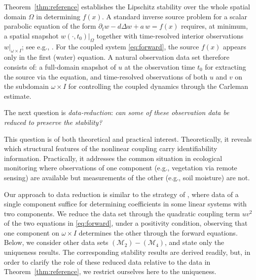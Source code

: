 \documentclass[12pt]{amsart}
\theoremstyle{plain}
\theoremstyle{definition}
\theoremstyle{remark}
\newcommand{\p}{\partial}
\newcommand{\OOO}{\Omega}
\newcommand{\Om}{\Omega}
\newcommand{\Lap}{\Delta}
\begin{document}
Theorem~\ref{thm:reference} establishes the Lipschitz stability over the whole spatial domain $\OOO$ in determining $f(x)$. A standard inverse source problem for a scalar parabolic equation of the form $\p_t w-d\Lap w+a\,w=f(x)$ requires, at minimum, a spatial snapshot $w(\cdot,t_0)|_\Om$ together with time-resolved interior observations $w|_{\omega\times I}$; see e.g., \cite{imanuvilov1998lipschitz,Y25}. For the coupled system \eqref{eq:forward}, the source $f(x)$ appears only in the first (water) equation. A natural observation data set therefore consists of: a full-domain snapshot of $u$ at the observation time $t_0$ for extracting the source via the equation, and time-resolved observations of both $u$ and $v$ on the subdomain $\omega\times I$ for controlling the coupled dynamics through the Carleman estimate.

The next question is \emph{data-reduction}:
\emph{can some of these observation data be reduced to preserve the stability?}

This question is of both theoretical and practical interest.
Theoretically, it reveals which structural features of the nonlinear coupling carry identifiability information. Practically, it addresses the common situation in ecological monitoring where observations of one component (e.g., vegetation via remote sensing) are available but measurements of the other (e.g., soil moisture) are not.

Our approach to data reduction is similar to the strategy of
\cite{benabdallah2009inverse, cristofol2006inverse}, where data of a single component suffice for determining coefficients in some linear systems with two components. We reduce the data set through the quadratic coupling term $uv^2$ of the two equations in \eqref{eq:forward}, under a positivity condition, observing that one component on $\omega\times I$ determines the other through the forward equations.
Below, we consider other data sets $(\mathcal{M}_2) - (\mathcal{M}_4)$, and state only the uniqueness results. The corresponding stability results are derived readily, but, in order to clarify the role of these reduced data relative to the data in Theorem~\ref{thm:reference}, we restrict ourselves here to the uniqueness.
\end{document}
